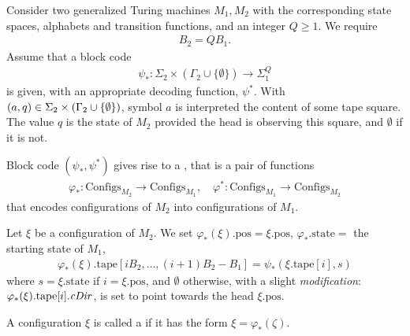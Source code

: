 \documentclass[12pt]{memoir}
\renewcommand{\ge}{\geq}
\newcommand{\fld}[1]{\ensuremath{\textit{#1\/}}}
\def\B{B}
\newcommand{\Configs}{\mathrm{Configs}}
\newcommand{\pos}{\mathrm{pos}}
\newcommand{\cDir}{\fld{cDir}}
\newcommand{\state}{\mathrm{state}}
\newcommand{\tape}{\mathrm{tape}}
\begin{document}
\begin{definition}\label{def:configuration-code}
Consider two generalized Turing machines \( M_{1},M_{2} \) with the corresponding
state spaces, alphabets and transition functions, and an integer \( Q\ge 1 \).
We require
\begin{align}\label{eq:B_2-B_1-Q}
  \B_{2} = Q \B_{1}.
\end{align}
Assume that a block code
\begin{align*}
   \psi_{*}:\Sigma_{2}\times(\Gamma_{2}\cup\{\emptyset\})\to\Sigma_{1}^{Q}
 \end{align*}
is given, with an appropriate decoding function, \( \psi^{*} \).
With \( (a,q)\in\Sigma_{2}\times(\Gamma_{2}\cup\{\emptyset\}) \),
symbol \( a \) is interpreted the content of some tape square.
The value \( q \) is the state of \( M_{2} \) provided the head is observing this square,
and \( \emptyset \) if it is not.

Block code \( (\psi_{*},\psi^{*}) \) gives rise to a 
, that is a pair of functions
    \begin{align*}
        \varphi_{*} :\Configs_{M_2} \to \Configs_{M_1},
        \quad
        \varphi^{*}:\Configs_{M_1} \to \Configs_{M_2}
    \end{align*}
    that encodes configurations of \( M_2 \) into configurations of \( M_{1} \).

Let \( \xi \) be a configuration of \( M_2 \).
We set \( \varphi_*(\xi).\pos = \xi.\pos \), \(\varphi_{*}.\state=  \) 
the starting state of \( M_{1} \),
\begin{align*}
 \varphi_*(\xi).\tape[i\B_2, \dots, (i+1)\B_2 - \B_1] = \psi_*(\xi.\tape[i], s)
 \end{align*}
where \( s=\xi.\state \) if \( i = \xi.\pos \), and \( \emptyset \) otherwise, with
a slight \emph{modification}: 
\( \varphi_{*}(\xi).\tape[i].\cDir \), is set to point towards the head \( \xi.\pos \).

A configuration \( \xi \) is called a  if 
it has the form \( \xi=\varphi_{*}(\zeta) \).
 \end{definition}
\end{document}
